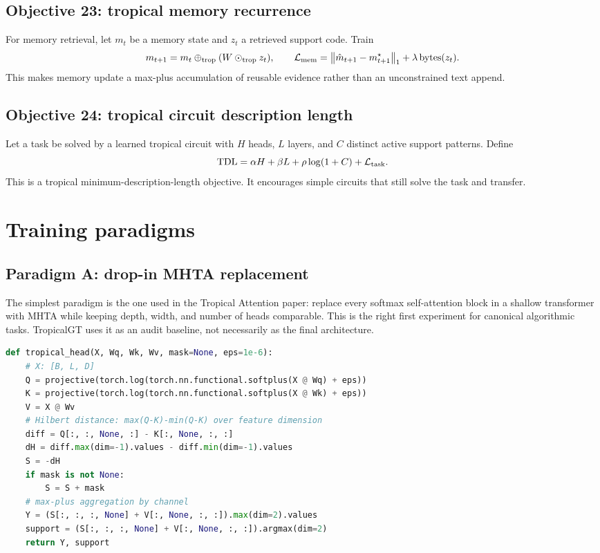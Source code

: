 \documentclass[11pt]{article}
\newcommand{\calL}{\mathcal{L}}
\newcommand{\oplusT}{\oplus_{\rm trop}}
\newcommand{\odotT}{\odot_{\rm trop}}
\newcommand{\norm}[1]{\left\lVert #1\right\rVert}
\begin{document}
\subsection{Objective 23: tropical memory recurrence}

For memory retrieval, let \(m_t\) be a memory state and \(z_t\) a retrieved support code.  Train
\begin{equation}
 m_{t+1}=m_t\oplusT (W\odotT z_t),\qquad \calL_{\rm mem}=\norm{\hat m_{t+1}-m_{t+1}^\star}_1+\lambda\operatorname{bytes}(z_t).
\end{equation}
This makes memory update a max-plus accumulation of reusable evidence rather than an unconstrained text append.

\subsection{Objective 24: tropical circuit description length}

Let a task be solved by a learned tropical circuit with \(H\) heads, \(L\) layers, and \(C\) distinct active support patterns.  Define
\begin{equation}
\operatorname{TDL}=\alpha H+\beta L+\rho\log(1+C)+\calL_{\rm task}.
\end{equation}
This is a tropical minimum-description-length objective.  It encourages simple circuits that still solve the task and transfer.

\section{Training paradigms}

\subsection{Paradigm A: drop-in MHTA replacement}

The simplest paradigm is the one used in the Tropical Attention paper: replace every softmax self-attention block in a shallow transformer with MHTA while keeping depth, width, and number of heads comparable.  This is the right first experiment for canonical algorithmic tasks.  TropicalGT uses it as an audit baseline, not necessarily as the final architecture.

\begin{lstlisting}[language=Python,caption={Minimal PyTorch-style tropical head.}]
def tropical_head(X, Wq, Wk, Wv, mask=None, eps=1e-6):
    # X: [B, L, D]
    Q = projective(torch.log(torch.nn.functional.softplus(X @ Wq) + eps))
    K = projective(torch.log(torch.nn.functional.softplus(X @ Wk) + eps))
    V = X @ Wv
    # Hilbert distance: max(Q-K)-min(Q-K) over feature dimension
    diff = Q[:, :, None, :] - K[:, None, :, :]
    dH = diff.max(dim=-1).values - diff.min(dim=-1).values
    S = -dH
    if mask is not None:
        S = S + mask
    # max-plus aggregation by channel
    Y = (S[:, :, :, None] + V[:, None, :, :]).max(dim=2).values
    support = (S[:, :, :, None] + V[:, None, :, :]).argmax(dim=2)
    return Y, support
\end{lstlisting}
\end{document}
